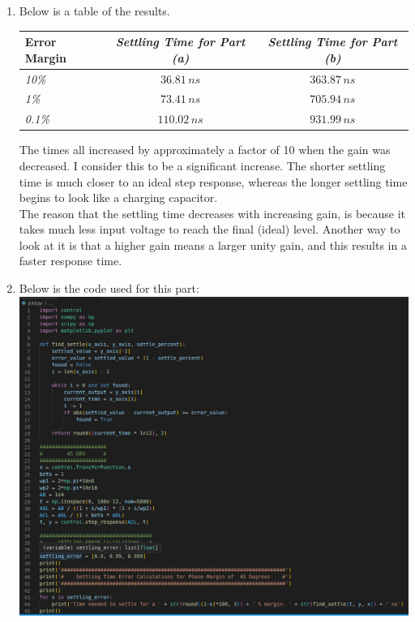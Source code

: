 \documentclass[12pt, fleqn]{article}
\begin{document}
\begin{enumerate}[label=(\alph*)]
        \newpage
        \item
        {
        Below is a table of the results.\\[0.25cm]
        \begin{table}[H]
            \centering
            \setlength{\tabcolsep}{20pt}
            \renewcommand{\arraystretch}{1.5}
            \begin{tabular}{|l|c|c|}
                \hline
                \textbf{Error Margin} & \textit{Settling Time for Part (a)} & \textit{Settling Time for Part (b)}\\
                \hline
                \textit{10\%} & $36.81\,ns$ & $363.87\,ns$\\
                \hline
                \textit{1\%} & $73.41\,ns$ & $705.94\,ns$\\
                \hline
                \textit{0.1\%} & $110.02\,ns$ & $931.99\,ns$\\
                \hline
            \end{tabular}
        \end{table}
        The times all increased by approximately a factor of 10 when the gain was decreased.  I consider this to be a significant increase.  The shorter settling time is much closer to an ideal step response, whereas the longer settling time begins to look like a charging capacitor.\\[0.25cm]
        The reason that the settling time decreases with increasing gain, is because it takes much less input voltage to reach the final (ideal) level.  Another way to look at it is that a higher gain means a larger unity gain, and this results in a faster response time.
        }
        \newpage
        \item
        {
        Below is the code used for this part:\\[0.25cm]
        \includegraphics[scale=0.3, center]{p3d_code1.PNG}\\[0.25cm]
}
\end{enumerate}
\end{document}
